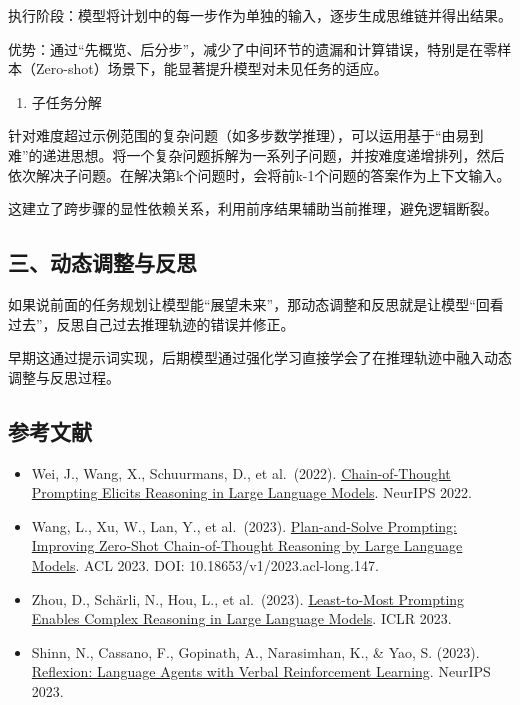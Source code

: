 执行阶段：模型将计划中的每一步作为单独的输入，逐步生成思维链并得出结果。

优势：通过``先概览、后分步''，减少了中间环节的遗漏和计算错误，特别是在零样本（Zero-shot）场景下，能显著提升模型对未见任务的适应。

\begin{enumerate}
\def\labelenumi{\arabic{enumi}.}
\setcounter{enumi}{1}
\tightlist
\item
  子任务分解
\end{enumerate}

针对难度超过示例范围的复杂问题（如多步数学推理），可以运用基于``由易到难''的递进思想。将一个复杂问题拆解为一系列子问题，并按难度递增排列，然后依次解决子问题。在解决第k个问题时，会将前k-1个问题的答案作为上下文输入。

这建立了跨步骤的显性依赖关系，利用前序结果辅助当前推理，避免逻辑断裂。

\hypertarget{ux4e09ux52a8ux6001ux8c03ux6574ux4e0eux53cdux601d}{%
\subsection{三、动态调整与反思}\label{ux4e09ux52a8ux6001ux8c03ux6574ux4e0eux53cdux601d}}

如果说前面的任务规划让模型能``展望未来''，那动态调整和反思就是让模型``回看过去''，反思自己过去推理轨迹的错误并修正。

早期这通过提示词实现，后期模型通过强化学习直接学会了在推理轨迹中融入动态调整与反思过程。

\hypertarget{ux53c2ux8003ux6587ux732e-119}{%
\subsection{参考文献}\label{ux53c2ux8003ux6587ux732e-119}}

\vspace{0.25em}
\begin{itemize}
\tightlist
\item
  Wei, J., Wang, X., Schuurmans, D., et al.~(2022). \href{https://arxiv.org/abs/2201.11903}{Chain-of-Thought Prompting Elicits Reasoning in Large Language Models}. NeurIPS 2022.
\item
  Wang, L., Xu, W., Lan, Y., et al.~(2023). \href{https://aclanthology.org/2023.acl-long.147/}{Plan-and-Solve Prompting: Improving Zero-Shot Chain-of-Thought Reasoning by Large Language Models}. ACL 2023. DOI: 10.18653/v1/2023.acl-long.147.
\item
  Zhou, D., Schärli, N., Hou, L., et al.~(2023). \href{https://openreview.net/forum?id=WZH7099tgfM}{Least-to-Most Prompting Enables Complex Reasoning in Large Language Models}. ICLR 2023.
\item
  Shinn, N., Cassano, F., Gopinath, A., Narasimhan, K., \& Yao, S. (2023). \href{https://arxiv.org/abs/2303.11366}{Reflexion: Language Agents with Verbal Reinforcement Learning}. NeurIPS 2023.
\end{itemize}

